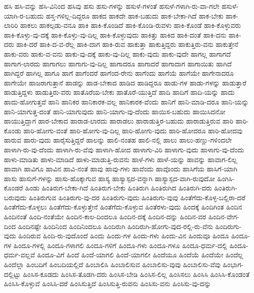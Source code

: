 {ಹಸಿ
ಹಸಿ-ವನ್ನು
ಹಸಿ-ವಿನಿಂದ
ಹಸಿವು
ಹಸು
ಹಸು-ಗಳನ್ನು
ಹಸುಳೆ-ಗಳಂತೆ
ಹಸುಳೆ-ಗಳಾಗಿ-ರು-ವಾ-ಗಲೇ
ಹಸುಳೆ-ಯಾಗಿ-ರ-ಬಹುದು
ಹಸ್ತ-ಗಳಿಲ್ಲ-ದಿದ್ದರೂ
ಹಾಕದ
ಹಾಕದೇ
ಹಾಕ-ಬಹುದು
ಹಾಕ-ಬೇಕಾ-ಗಿದೆ
ಹಾಕ-ಬೇಕು
ಹಾಕ-ಲಾರಿರಿ
ಹಾಕಲು
ಹಾಕಲ್ಪಡು-ವನೂ
ಹಾಕಿ
ಹಾಕಿ-ಕೊಂಡಿದೆ
ಹಾಕಿ-ಕೊಂಡಿ-ರುವಳು
ಹಾಕಿ-ಕೊಂಡೆ
ಹಾಕಿ-ಕೊಳ್ಳುವರು
ಹಾಕಿ-ಕೊಳ್ಳು-ವು-ದಕ್ಕೆ
ಹಾಕಿ-ಕೊಳ್ಳು-ವು-ದಿಲ್ಲ
ಹಾಕಿ-ಕೊಳ್ಳುವುದು
ಹಾಕಿತ್ತು
ಹಾಕಿದ
ಹಾಕಿ-ದಂತೆ
ಹಾಕಿ-ದನು
ಹಾಕಿ-ದರು
ಹಾಕಿ-ದರೆ
ಹಾಕಿ-ದ-ವ-ರೆಲ್ಲ
ಹಾಕಿ-ದಾಗ
ಹಾಕಿ-ರುವ
ಹಾಕುತ್ತಾ
ಹಾಕುತ್ತಿದ್ದರು
ಹಾಕುತ್ತಿರು-ವನು
ಹಾಕುತ್ತೇನೆ
ಹಾಕು-ವರು
ಹಾಕು-ವ-ವನು
ಹಾಕು-ವು-ದಕ್ಕೆ
ಹಾಕು-ವು-ದಿಲ್ಲ
ಹಾಕು-ವುದು
ಹಾಕು-ವುದೇ
ಹಾಗಲ್ಲ
ಹಾಗಾಗದೆ
ಹಾಗಾಗ-ಲಾರದು
ಹಾಗಾಗಲು
ಹಾಗಾಗು-ವು-ದಿಲ್ಲ
ಹಾಗಾದರೂ
ಹಾಗಾದರೆ
ಹಾಗಾದಾಗ
ಹಾಗಾಯಿತು
ಹಾಗಿದೆ
ಹಾಗಿದ್ದರೆ
ಹಾಗಿಲ್ಲ
ಹಾಗೂ
ಹಾಗೆ
ಹಾಗೆಂದರೆ
ಹಾಗೆಂದ-ರೇನು
ಹಾಗೆಂದು
ಹಾಗೆಯೆ
ಹಾಗೆಯೇ
ಹಾಗೇನಾದರೂ
ಹಾಗೇಯೇ
ಹಾಜರಾಗುತ್ತಾನೆ
ಹಾಡನ್ನು
ಹಾಡ-ಬೇಕಾದ
ಹಾಡಿದ
ಹಾಡಿದ್ದರೂ
ಹಾಡು-ಗಳ
ಹಾಡು-ಗಳನ್ನು
ಹಾಡುತ್ತಾರೆ
ಹಾಡುತ್ತಿದ್ದಳು
ಹಾಡುತ್ತಿರು-ವರು
ಹಾತೊರೆಯ-ಬೇಕು
ಹಾತೊರೆ-ಯುತ್ತಿದೆ
ಹಾದಿ
ಹಾದಿಗೆ
ಹಾದಿ-ಯನ್ನು
ಹಾದು
ಹಾದು-ಹೋಗುತ್ತವೆ
ಹಾನಿ
ಹಾನಿಕರ
ಹಾನಿಕಾರಕ-ವಲ್ಲ
ಹಾನಿಕಾರಕ-ವೆಂದು
ಹಾನಿಗೆ
ಹಾನಿ-ಮಾಡಿ-ದರೂ
ಹಾನಿ-ಯನ್ನು
ಹಾನಿ-ಯಾಗುತ್ತ-ದಂತೆ
ಹಾನಿ-ಯಾಗುವುದು
ಹಾನಿ-ಯಾಗು-ವು-ದೆಂದು
ಹಾಯಿಸ-ಬಹುದು
ಹಾಯಿಸಿದನೋ
ಹಾಯುತ್ತಿದ್ದಾಗ
ಹಾರ-ಬೇಕಾದ
ಹಾರಾಡ-ಲಾರದು
ಹಾರಾಡಲು
ಹಾರಾಡುತ್ತಿರ-ಬಹುದು
ಹಾರಾಡುತ್ತಿರುವ
ಹಾರಿ
ಹಾರಿ-ಕೊಂಡು
ಹಾರಿ-ಹೋಗು-ವಂತೆ
ಹಾರಿ-ಹೋಗು-ವು-ದಿಲ್ಲ
ಹಾರಿ-ಹೋಗು-ವುದು
ಹಾರಿ-ಹೋದರೂ
ಹಾರಿ-ಹೋದವು
ಹಾರುವ
ಹಾರು-ವುದು
ಹಾರೈಸುತ್ತಿದ್ದರೆ
ಹಾಲನ್ನು
ಹಾಲಿ-ನಂತಹ
ಹಾಲಿ-ನಲ್ಲಿ
ಹಾಲು
ಹಾಲು-ಹಣ್ಣು-ಗಳಿಂದಲೇ
ಹಾಳಾಗಿ-ರು-ವು-ದೆಂದು
ಹಾಳಾಗಿ-ರು-ವೆವು
ಹಾಳಾಗಿ-ಹೋದ
ಹಾಳಾಗು-ವಿರಿ
ಹಾಳಾಗು-ವುದು
ಹಾಳಾಗು-ವು-ದೆಂದು
ಹಾಳು-ಮಾಡಿತು
ಹಾಳು-ಮಾಡಿದೆ
ಹಾಳು-ಮಾಡುತ್ತಿ-ರುವನು
ಹಾಳೆ-ಗಳು
ಹಾಳೆ-ಯನ್ನು
ಹಾವನ್ನು
ಹಾವಾಗ-ಲಿಲ್ಲ
ಹಾವಾಗಿ
ಹಾವಿಗೂ
ಹಾವಿನ
ಹಾವಿ-ನಂತೆ
ಹಾವು
ಹಾವು-ಗಳು
ಹಾವೆಂದು
ಹಾವೊಂದು
ಹಾಸಿಗೆಯ
ಹಾಸಿಗೆ-ಯಾಗಿ
ಹಾಸು
ಹಾಸುಗೆ-ಗಳನ್ನು
ಹಾಸು-ಹೊಕ್ಕಾಗುವ
ಹಾಸ್ಯ
ಹಾಸ್ಯಾಸ್ಪದ-ವನ್ನಾಗಿ
ಹಾಸ್ಯಾಸ್ಪದ-ವಾಗಿ-ರುವುದೋ
ಹಿಂಗಿಸಿ-ಕೊಂಡರೆ
ಹಿಂಡು
ಹಿಂತಿರುಗ-ಬೇಕಾ-ಗಿದೆ
ಹಿಂತಿರುಗ-ಬೇಕು
ಹಿಂತಿರುಗಿ
ಹಿಂತಿರುಗಿದ
ಹಿಂತಿರುಗಿ-ದರು
ಹಿಂತಿರುಗಿ-ಬರುವುದು
ಹಿಂತಿರುಗುವ
ಹಿಂತಿರುಗು-ವು-ದರ
ಹಿಂತಿರುಗು-ವುದು
ಹಿಂತಿರುಗು-ವುವು
ಹಿಂತೆಗೆದು-ಕೊಳ್ಳ-ಬಲ್ಲಿರಾ-ದರೆ
ಹಿಂತೆಗೆದು-ಕೊಳ್ಳಲು
ಹಿಂತೆಗೆದು-ಕೊಳ್ಳುತ್ತೇನೆ
ಹಿಂತೆಗೆದು-ಕೊಳ್ಳುವ
ಹಿಂತೆರಳು-ವುದು
ಹಿಂದಕ್ಕೆ
ಹಿಂದಿಗಿಂತ
ಹಿಂದಿನ
ಹಿಂದಿನಂತೆ
ಹಿಂದಿ-ನಂತೆಯೇ
ಹಿಂದಿನ-ಕಾಲ-ದಿಂದಲೂ
ಹಿಂದಿನ-ದಕ್ಕೆ
ಹಿಂದಿನ-ದನ್ನು
ಹಿಂದಿನ-ವರ
ಹಿಂದಿನ-ವೇಗ-ದಿಂದ
ಹಿಂದಿನಷ್ಟೇ
ಹಿಂದಿನಿಂದ
ಹಿಂದಿನಿಂದಲೂ
ಹಿಂದಿರುಗಿ
ಹಿಂದಿರುಗಿ-ಹೋಗು-ವುದ-ರಲ್ಲಿ-ರು-ವೆನು
ಹಿಂದಿರುಗು-ವುದು
ಹಿಂದಿರುವ
ಹಿಂದಿ-ರು-ವುದೊಂದೆ
ಹಿಂದು
ಹಿಂದು-ಗಳ
ಹಿಂದು-ಗಳು
ಹಿಂದು-ವಿನ
ಹಿಂದುವೂ
ಹಿಂದೂ
ಹಿಂದೂ-ಗಳ
ಹಿಂದೂ-ಗಳಲ್ಲಿ
ಹಿಂದೂ-ಗಳಾಗಲಿ
ಹಿಂದೂ-ಗಳಿಗೆ
ಹಿಂದೂ-ಗಳು
ಹಿಂದೂ-ಗಳೂ
ಹಿಂದೂ-ಧರ್ಮ-ದಲ್ಲಿ
ಹಿಂದೂ-ಧರ್ಮ-ವಲ್ಲವೆ
ಹಿಂದೂ-ವಿಗೆ
ಹಿಂದೆ
ಹಿಂದೆ-ಯಾಗಲಿ
ಹಿಂದೆ-ಯಾಗಲೀ
ಹಿಂದೆಯೂ
ಹಿಂದೆಯೆ
ಹಿಂದೆಯೇ
ಹಿಂದೆಲ್ಲ
ಹಿಂದೆಲ್ಲಾ
ಹಿಂಬದಿಗೆ
ಹಿಂಬದಿಯಲ್ಲಿದೆ
ಹಿಂಬಾಲಿಸಿ
ಹಿಂಬಾಲಿಸುವ
ಹಿಂಬಾಲಿಸು-ವುವು
ಹಿಂಬಾಲಿಸು-ವೆವು
ಹಿಂಭಾಗ-ದಲ್ಲಿಟ್ಟು
ಹಿಂಸಿಸ-ಕೂಡದು
ಹಿಂಸಿಸ-ತೊಡಗಿ-ದರು
ಹಿಂಸಿಸ-ಬೇಡಿ
ಹಿಂಸಿಸ-ಲಿಲ್ಲ
ಹಿಂಸಿಸಲು
ಹಿಂಸಿಸಿ
ಹಿಂಸಿಸಿ-ಕೊಂಡಂತೆ
ಹಿಂಸಿಸಿ-ಕೊಳ್ಳುವೆ
ಹಿಂಸಿಸಿ-ದರೆ
ಹಿಂಸಿಸುತ್ತಿದೆ
ಹಿಂಸಿಸುತ್ತಿ-ರುವನು
ಹಿಂಸಿಸು-ವನು
ಹಿಂಸಿಸು-ವು-ದನ್ನು
}
